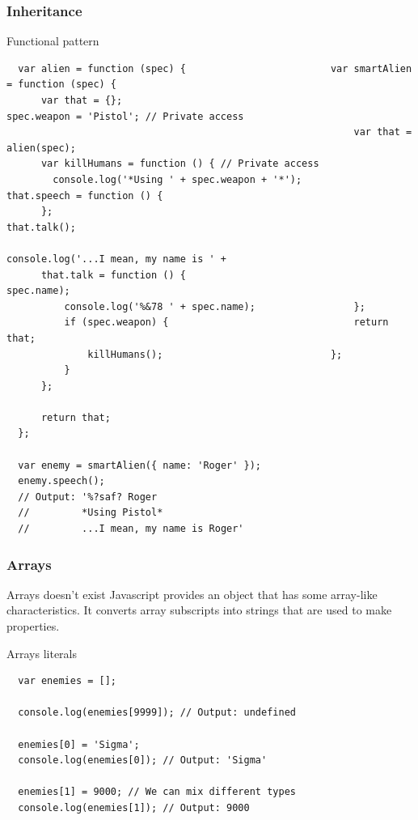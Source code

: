 \begin{frame}[fragile]
  \frametitle{Inheritance}

  \begin{block}{Functional pattern}
  {\tiny
  \begin{verbatim}
  var alien = function (spec) {                         var smartAlien = function (spec) {
      var that = {};                                        spec.weapon = 'Pistol'; // Private access
                                                            var that = alien(spec);
      var killHumans = function () { // Private access                                                             
        console.log('*Using ' + spec.weapon + '*');         that.speech = function () {
      };                                                        that.talk();
                                                                console.log('...I mean, my name is ' +
      that.talk = function () {                                   spec.name);
          console.log('%&78 ' + spec.name);                 };                                                       
          if (spec.weapon) {                                return that;
              killHumans();                             };
          }
      };

      return that;
  };

  var enemy = smartAlien({ name: 'Roger' });
  enemy.speech(); 
  // Output: '%?saf? Roger
  //         *Using Pistol*
  //         ...I mean, my name is Roger'
  \end{verbatim}
  }
  \end{block}
\end{frame}

\begin{frame}[fragile]
  \frametitle{Arrays}

  \begin{block}{Arrays doesn't exist}
  Javascript provides an object that has some array-like characteristics. It converts array subscripts into strings that are used to make properties.
  \end{block}

  \pause

  \begin{block}{Arrays literals}
  {\scriptsize
  \begin{verbatim}
  var enemies = [];

  console.log(enemies[9999]); // Output: undefined

  enemies[0] = 'Sigma';
  console.log(enemies[0]); // Output: 'Sigma'

  enemies[1] = 9000; // We can mix different types
  console.log(enemies[1]); // Output: 9000

  \end{verbatim}
  }
  \end{block}
\end{frame}

